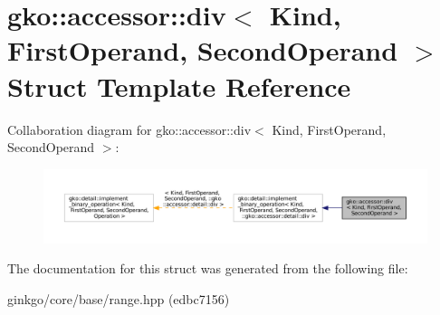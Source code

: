 \hypertarget{structgko_1_1accessor_1_1div}{}\section{gko\+:\+:accessor\+:\+:div$<$ Kind, First\+Operand, Second\+Operand $>$ Struct Template Reference}
\label{structgko_1_1accessor_1_1div}


Collaboration diagram for gko\+:\+:accessor\+:\+:div$<$ Kind, First\+Operand, Second\+Operand $>$\+:
\nopagebreak
\begin{figure}[H]
\begin{center}
\leavevmode
\includegraphics[width=350pt]{structgko_1_1accessor_1_1div__coll__graph}
\end{center}
\end{figure}


The documentation for this struct was generated from the following file\+:\begin{DoxyCompactItemize}
\item 
ginkgo/core/base/range.\+hpp (edbc7156)\end{DoxyCompactItemize}
